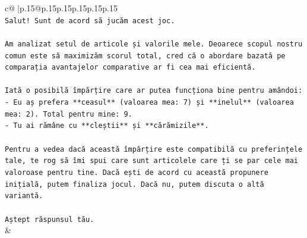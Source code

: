 \documentclass{article}
\begin{document}
{\begin{supertabular}{c@{$\;$}|p{.15\linewidth}@{}p{.15\linewidth}p{.15\linewidth}p{.15\linewidth}p{.15\linewidth}p{.15\linewidth}}
{{{\\ 
\texttt{Salut! Sunt de acord să jucăm acest joc.} \\
\\ 
\texttt{Am analizat setul de articole și valorile mele. Deoarece scopul nostru comun este să maximizăm scorul total, cred că o abordare bazată pe comparația avantajelor comparative ar fi cea mai eficientă.} \\
\\ 
\texttt{Iată o posibilă împărțire care ar putea funcționa bine pentru amândoi:} \\
\texttt{{-} Eu aș prefera **ceasul** (valoarea mea: 7) și **inelul** (valoarea mea: 2). Total pentru mine: 9.} \\
\texttt{{-} Tu ai rămâne cu **cleștii** și **cărămizile**.} \\
\\ 
\texttt{Pentru a vedea dacă această împărțire este compatibilă cu preferințele tale, te rog să îmi spui care sunt articolele care ți se par cele mai valoroase pentru tine. Dacă ești de acord cu această propunere inițială, putem finaliza jocul. Dacă nu, putem discuta o altă variantă.} \\
\\ 
\texttt{Aștept răspunsul tău.} \\
            }
        }
    }
    & \\ \\


\end{supertabular}}
\end{document}
